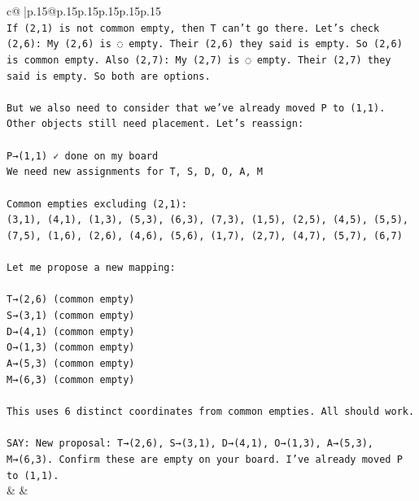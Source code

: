 \documentclass{article}
\begin{document}
{\begin{supertabular}{c@{$\;$}|p{.15\linewidth}@{}p{.15\linewidth}p{.15\linewidth}p{.15\linewidth}p{.15\linewidth}p{.15\linewidth}}
{{{\\ 
\texttt{If (2,1) is not common empty, then T can't go there. Let's check (2,6): My (2,6) is ◌ empty. Their (2,6) they said is empty. So (2,6) is common empty. Also (2,7): My (2,7) is ◌ empty. Their (2,7) they said is empty. So both are options.} \\
\\ 
\texttt{But we also need to consider that we've already moved P to (1,1). Other objects still need placement. Let's reassign:} \\
\\ 
\texttt{P→(1,1) ✓ done on my board} \\
\texttt{We need new assignments for T, S, D, O, A, M} \\
\\ 
\texttt{Common empties excluding (2,1): } \\
\texttt{(3,1), (4,1), (1,3), (5,3), (6,3), (7,3), (1,5), (2,5), (4,5), (5,5), (7,5), (1,6), (2,6), (4,6), (5,6), (1,7), (2,7), (4,7), (5,7), (6,7)} \\
\\ 
\texttt{Let me propose a new mapping:} \\
\\ 
\texttt{T→(2,6)  (common empty)} \\
\texttt{S→(3,1)  (common empty)} \\
\texttt{D→(4,1)  (common empty)} \\
\texttt{O→(1,3)  (common empty)} \\
\texttt{A→(5,3)  (common empty)} \\
\texttt{M→(6,3)  (common empty)} \\
\\ 
\texttt{This uses 6 distinct coordinates from common empties. All should work.} \\
\\ 
\texttt{SAY: New proposal: T→(2,6), S→(3,1), D→(4,1), O→(1,3), A→(5,3), M→(6,3). Confirm these are empty on your board. I've already moved P to (1,1).} \\
            }
        }
    }
    & & \\ \\


\end{supertabular}}
\end{document}
